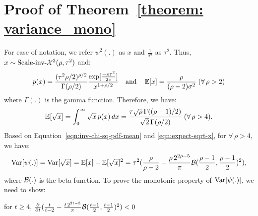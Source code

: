 


\section{Proof of Theorem~\ref{theorem: variance_mono}}\label{app:proof_mono}

For ease of notation, we refer $\psi^2(.)$ as $x$ and $\frac{1}{\sigma^2}$ as $\tau^2$. 
Thus, $x \sim \mbox{Scale-inv-}\mathcal{X}^2(\rho, \tau^2)$ and:
\begin{align}
\vspace{-0.3in}
p(x) = \frac{(\tau^2\rho/2)^{\rho/2}}{\Gamma(\rho/2)}\frac{\exp[\frac{-\rho\tau^2}{2x}]}{x^{1 + \rho/2}}
\quad\mbox{and}\quad
\E[x] = \frac{\rho}{(\rho - 2) \sigma^2} \;(\forall\, \rho > 2)
\label{eqn:inv-chi-sq-pdf-mean}
\vspace{-0.3in}
\end{align}
where $\Gamma(.)$ is the gamma function. Therefore, we have:
\begin{align}
\vspace{-0.3in}
    \E[\sqrt{x}] = \int_{0}^{\infty} \sqrt{x}\, p(x)\,dx = \frac{\tau \sqrt{\rho} \,\Gamma( (\rho - 1)/2)}{\sqrt{2} \,\Gamma(\rho/2)}\; (\forall\, \rho > 4).
    \label{eqn:expect-sqrt-x}
\vspace{-0.3in}
\end{align}
Based on Equation~\ref{eqn:inv-chi-sq-pdf-mean} and \ref{eqn:expect-sqrt-x}, for $\forall\, \rho > 4$, we have:
\begin{align}
\vspace{-0.5in}
\Var[\psi(.)] = \Var[\sqrt{x}] = \E[x] - \E[\sqrt{x}]^2 = \tau^2 (\frac{\rho}{\rho-2} - \frac{\rho \,2^{2\rho - 5}}{\pi}\gB(\frac{\rho-1}{2}, \frac{\rho-1}{2})^2),
\vspace{-0.5in}
\end{align}
where ${\mathcal{B}}(.)$ is the beta function. To prove the monotonic property of $\operatorname{{\rm Var}}[\psi(.)]$, we need to show:

\begin{lemma}
for $t \geq 4$, $\frac{\partial }{\partial t} (\frac{t}{t-2} - \frac{t \,2^{2t - 5}}{\pi}{\mathcal{B}}(\frac{t-1}{2}, \frac{t-1}{2})^2) < 0$
\end{lemma}

